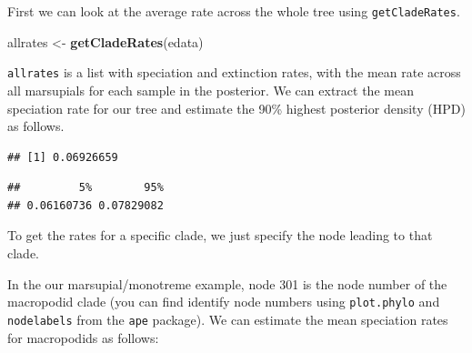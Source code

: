 \documentclass[]{book}
\newenvironment{Shaded}{\begin{snugshade}}{\end{snugshade}}
\newcommand{\KeywordTok}[1]{\textcolor[rgb]{0.13,0.29,0.53}{\textbf{{#1}}}}
\newcommand{\DataTypeTok}[1]{\textcolor[rgb]{0.13,0.29,0.53}{{#1}}}
\newcommand{\DecValTok}[1]{\textcolor[rgb]{0.00,0.00,0.81}{{#1}}}
\newcommand{\FloatTok}[1]{\textcolor[rgb]{0.00,0.00,0.81}{{#1}}}
\newcommand{\StringTok}[1]{\textcolor[rgb]{0.31,0.60,0.02}{{#1}}}
\newcommand{\NormalTok}[1]{{#1}}
\theoremstyle{definition}
\theoremstyle{definition}
\theoremstyle{definition}
\theoremstyle{remark}
\begin{document}
First we can look at the average rate across the whole tree using
\texttt{getCladeRates}.

\begin{Shaded}
\begin{Highlighting}[]
\NormalTok{allrates <-}\StringTok{ }\KeywordTok{getCladeRates}\NormalTok{(edata)}
\end{Highlighting}
\end{Shaded}

\texttt{allrates} is a list with speciation and extinction rates, with
the mean rate across all marsupials for each sample in the posterior. We
can extract the mean speciation rate for our tree and estimate the 90\%
highest posterior density (HPD) as follows.

\begin{Shaded}
\end{Shaded}

\begin{verbatim}
## [1] 0.06926659
\end{verbatim}

\begin{Shaded}
\end{Shaded}

\begin{verbatim}
##         5%        95% 
## 0.06160736 0.07829082
\end{verbatim}

To get the rates for a specific clade, we just specify the node leading
to that clade.

In the our marsupial/monotreme example, node 301 is the node number of
the macropodid clade (you can find identify node numbers using
\texttt{plot.phylo} and \texttt{nodelabels} from the \texttt{ape}
package). We can estimate the mean speciation rates for macropodids as
follows:

\begin{Shaded}
\end{Shaded}
\end{document}

